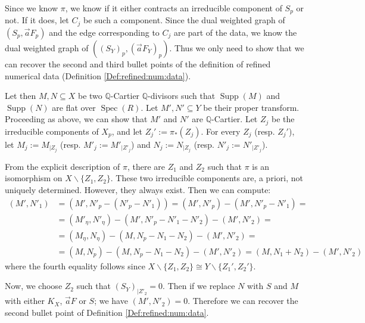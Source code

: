 \documentclass[11pt]{amsart}
\newcommand{\spec}{\operatorname{Spec}}
\newcommand{\supp}{\operatorname{Supp}}
\theoremstyle{definition}
\begin{document}
 Since we know $\pi$, we know if it either contracts an irreducible component of $S_p$ or not. If
 it does, let $C_j$ be such a component.
  Since the dual weighted graph of $(S_p,\vec{a}F_p)$ and the edge corresponding to $C_j$ are part of the data, we know the dual
  weighted graph of $((S_Y)_p,(\vec{a}F_Y)_p)$. Thus we only need to show that we can recover the second and third bullet points of the definition of refined
  numerical data (Definition \ref{Def:refined:num:data}).
  
  Let then $M,N \subseteq X$ be two $\mathbb{Q}$-Cartier $\mathbb{Q}$-divisors such that
  $\supp(  M)$ and $\supp( N )$ are flat over $\spec(R)$.
  Let $M',N' \subseteq Y$ be their proper
  transform. Proceeding as above, we can show that $M'$ and $N'$ are $\mathbb{Q}$-Cartier.  Let $Z_j$ be the irreducible components of $X_p$, and let $Z_j':=\pi_*(Z_j)$. For every $Z_j$ (resp. $Z_j'$), let
  $M_j:=M_{|Z_j}$ (resp. $M'_j:=M'_{|Z'_j}$) and $N_j:=N_{|Z_j}$ (resp. $N'_j:=N'_{|Z'_j}$).
 
From the explicit description of $\pi$, there are $Z_1$ and $Z_2$
  such that $\pi$ is an isomorphism on $X \smallsetminus \{Z_1,Z_2\}$.
  These two irreducible components are, a priori, not uniquely determined. However, they always exist.  
  Then we can compute:
\begin{align*}
(M',N'_1)&=(M',N'_p - (N'_p - N'_1))
=(M',N'_p)-(M',N'_p - N'_1)=\\
&=(M'_\eta,N'_\eta)-(M',N'_p - N'_1-N'_2)-(M',N'_2)=\\&
=(M_\eta,N_\eta)-(M,N_p - N_1-N_2)-(M',N'_2)=\\
&=(M,N_p)-(M,N_p - N_1-N_2)-(M',N'_2)=(M,N_1+N_2)-(M',N'_2)
\end{align*}
where the fourth equality follows since $X \smallsetminus \{Z_1,Z_2\} \cong Y \smallsetminus \{Z_1',Z_2'\}$.

Now, we choose $Z_2$
such that $(S_Y)_{|Z'_2}=0$. Then
if we replace $N$ with $S$ and $M$ with either $K_{X}$, $\vec{a}F$ or $S$; we have  $(M',N'_2)=0$.
Therefore we can recover the second bullet point of Definition
\ref{Def:refined:num:data}.
\end{document}
